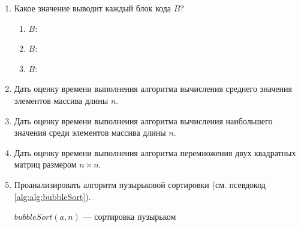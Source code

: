 \begin{enumerate}
    \item Какое значение выводит каждый блок кода $B$?
    \begin{enumerate}
        \item $B$:
            \begin{algorithmic}[1]
                \ENDFOR
            \end{algorithmic}
        \item $B$:
            \begin{algorithmic}[1]
                    \ENDFOR
                \ENDFOR
            \end{algorithmic}
        \item $B$:
            \begin{algorithmic}[1]
                        \ENDFOR
                    \ENDFOR
                \ENDFOR
            \end{algorithmic}
    \end{enumerate}
    
    \item Дать оценку времени выполнения алгоритма вычисления среднего значения элементов массива длины $n$.
    
    \item Дать оценку времени выполнения алгоритма вычисления наибольшего значения среди элементов массива длины $n$.
    
    \item Дать оценку времени выполнения алгоритма перемножения двух квадратных матриц размером $n\times n$.
    
    \item Проанализировать алгоритм пузырьковой сортировки (см. псевдокод \ref{alg:alg:bubbleSort}).
    \begin{algorithm}
        \caption{$bubbleSort(a,n)$ --- сортировка пузырьком}
        \label{alg:alg:bubbleSort}
        \begin{algorithmic}[1]
            

\end{algorithmic}
\end{algorithm}
\end{enumerate}
